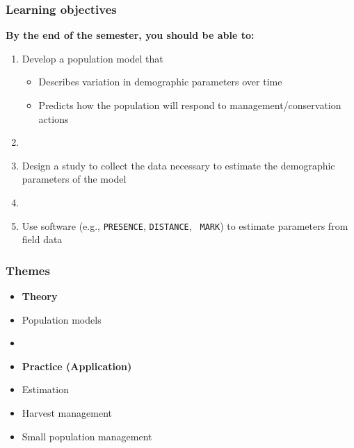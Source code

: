 \documentclass[color=usenames,dvipsnames]{beamer}
\begin{document}
\begin{frame}
  \frametitle{Learning objectives}
  \large
  {\bf By the end of the semester, you should be able to: \\}
  \vspace{0.3cm}
  \begin{enumerate}[\bf (1)]
    \large
    \item<1-> Develop a population model that
      \begin{itemize}
        \normalsize %
        \item Describes variation in demographic parameters over time
        \item Predicts how the population will respond to
          management/conservation actions
      \end{itemize}
    \item[]
    \item<2-> Design a study to collect the data necessary to estimate
      the demographic parameters of the model
    \item[]
    \item<3-> Use software (e.g., {\tt PRESENCE}, {\tt DISTANCE}, {\tt
        MARK}) to estimate parameters from field data
  \end{enumerate}
\end{frame}







\begin{frame}
  \frametitle{Themes}
  \Large
  \begin{itemize}
    \item[] {\hspace{-0.9cm} \bf Theory}
    \item Population models
    \item[]
    \item[] {\hspace{-0.9cm} \bf Practice (Application)}
    \item Estimation
    \item Harvest management
    \item Small population management
  \end{itemize}
\end{frame}
\end{document}
